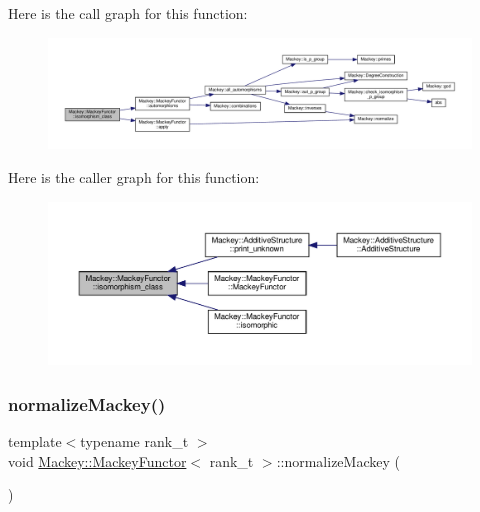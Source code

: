 Here is the call graph for this function\+:\nopagebreak
\begin{figure}[H]
\begin{center}
\leavevmode
\includegraphics[width=350pt]{classMackey_1_1MackeyFunctor_a71e081ee78f53fe74e8f65106865f4c5_cgraph}
\end{center}
\end{figure}
Here is the caller graph for this function\+:\nopagebreak
\begin{figure}[H]
\begin{center}
\leavevmode
\includegraphics[width=350pt]{classMackey_1_1MackeyFunctor_a71e081ee78f53fe74e8f65106865f4c5_icgraph}
\end{center}
\end{figure}
\mbox{\label{classMackey_1_1MackeyFunctor_a08150b3655fc27a7298d68b1857d830f}} 
\subsubsection{\texorpdfstring{normalize\+Mackey()}{normalizeMackey()}}
{\footnotesize\ttfamily template$<$typename rank\+\_\+t $>$ \\
void \hyperlink{classMackey_1_1MackeyFunctor}{Mackey\+::\+Mackey\+Functor}$<$ rank\+\_\+t $>$\+::normalize\+Mackey (\begin{DoxyParamCaption}{ }\end{DoxyParamCaption})}



